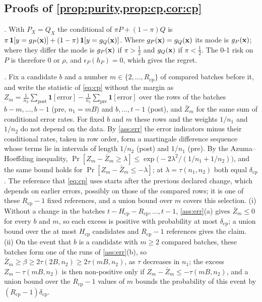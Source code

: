 \documentclass[11pt]{article}
\theoremstyle{plain}
\theoremstyle{definition}
\theoremstyle{remark}
\begin{document}
\subsection{Proofs of \texorpdfstring{\cref{prop:purity,prop:cp,cor:cp}}{Propositions 2 and 3 and Corollary 1}}

\emph{.} With $P_X=Q_X$ the conditional of $\pi P+(1-\pi)Q$ is
$\pi\,\mathbf 1[y=g_P(\mathbf{x})]+(1-\pi)\,\mathbf 1[y=g_Q(\mathbf{x})]$. Where $g_P(\mathbf{x})=g_Q(\mathbf{x})$ its mode is $g_P(\mathbf{x})$; where
they differ the mode is $g_P(\mathbf{x})$ if $\pi>\tfrac12$ and $g_Q(\mathbf{x})$ if $\pi<\tfrac12$. The 0-1 risk on $P$ is therefore
$0$ or $\rho$, and $\epsilon_P(h_P)=0$, which gives the regret.

\emph{.} Fix a candidate $b$ and a number $m\in\{2,\dots,R_{\mathrm{cp}}\}$ of compared batches before
it, and write the statistic of \eqref{eq:cp} without the margin as
$Z_m=\frac1{n_2}\sum_{\mathrm{post}}\mathbf 1[\text{error}]-\frac1{n_1}\sum_{\mathrm{pre}}\mathbf 1[\text{error}]$ over
the rows of the batches $b-m,\dots,b-1$ (pre, $n_1=mB$) and $b,\dots,t-1$ (post), and $\bar Z_m$ for the same sum of
conditional error rates. For fixed $b$ and $m$ these rows and the weights $1/n_1$ and $1/n_2$ do not depend on the
data. By \cref{ass:err} the error indicators minus their conditional rates, taken in row order, form a martingale
difference sequence whose terms lie in intervals of length $1/n_2$ (post) and $1/n_1$ (pre). By the
Azuma--Hoeffding inequality, $\Pr[Z_m-\bar Z_m\ge\lambda]\le\exp\bigl(-2\lambda^2/(1/n_1+1/n_2)\bigr)$, and the same
bound holds for $\Pr[Z_m-\bar Z_m\le-\lambda]$; at $\lambda=\tau(n_1,n_2)$ both equal $\delta_{\mathrm{cp}}$. The
reference that \eqref{eq:cp} uses starts after the previous declared change, which depends on earlier errors,
possibly on those of the compared rows; it is one of these $R_{\mathrm{cp}}-1$ fixed references, and a union bound
over $m$ covers this selection. (i) Without a change in the batches $t-H_{\mathrm{cp}}-R_{\mathrm{cp}},\dots,t-1$,
\cref{ass:err}(a) gives $\bar Z_m\le0$ for every $b$ and $m$, so each excess is positive with probability at most
$\delta_{\mathrm{cp}}$; a union bound over the at most $H_{\mathrm{cp}}$ candidates and $R_{\mathrm{cp}}-1$ references
gives the claim. (ii) On the event that $b$ is a candidate with $m\ge2$ compared batches, these batches form one of
the runs of \cref{ass:err}(b), so $\bar Z_m\ge\beta\ge2\tau(2B,n_2)\ge2\tau(mB,n_2)$, as $\tau$ decreases in $n_1$; the
excess $Z_m-\tau(mB,n_2)$ is then non-positive only if $Z_m-\bar Z_m\le-\tau(mB,n_2)$, and a union bound over the
$R_{\mathrm{cp}}-1$ values of $m$ bounds the probability of this event by $(R_{\mathrm{cp}}-1)\delta_{\mathrm{cp}}$.
\end{document}
